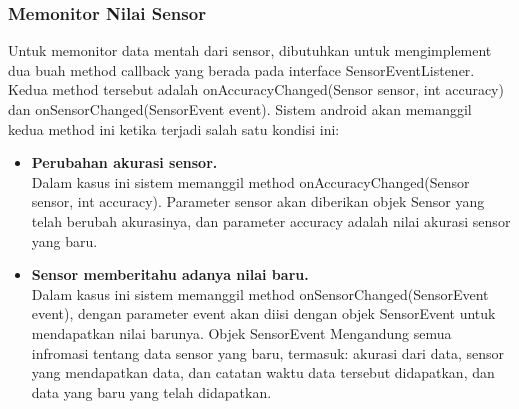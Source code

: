 \subsubsection{Memonitor Nilai Sensor}
\label{sssec:memonitor_nilai_sensor}

Untuk memonitor data mentah dari sensor, dibutuhkan untuk mengimplement dua buah method callback yang berada pada interface SensorEventListener. Kedua method tersebut adalah onAccuracyChanged(Sensor sensor, int accuracy) dan onSensorChanged(SensorEvent event). Sistem android akan memanggil kedua method ini ketika terjadi salah satu kondisi ini:

\begin{itemize}
	\item \textbf{Perubahan akurasi sensor.}\\
Dalam kasus ini sistem memanggil method onAccuracyChanged(Sensor sensor, int accuracy). Parameter sensor akan diberikan objek Sensor yang telah berubah akurasinya, dan parameter accuracy adalah nilai akurasi sensor yang baru.
	\item \textbf{Sensor memberitahu adanya nilai baru.}\\
Dalam kasus ini sistem memanggil method onSensorChanged(SensorEvent event), dengan parameter event akan diisi dengan objek SensorEvent untuk mendapatkan nilai barunya. Objek SensorEvent Mengandung semua infromasi tentang data sensor yang baru, termasuk: akurasi dari data, sensor yang mendapatkan data, dan catatan waktu data tersebut didapatkan, dan data yang baru yang telah didapatkan.
\end{itemize}

